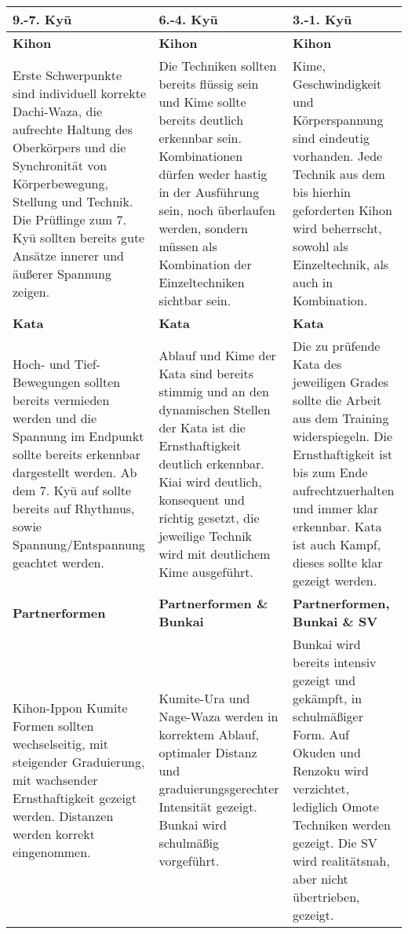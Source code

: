	\null\vfill\null
	\begin{tabularx}{\linewidth}{XXX}
		9.-7. Ky\={u}	& 6.-4. Ky\={u}	& 3.-1. Ky\={u}\\
		\midrule
		{\footnotesize \textbf{Kihon}}&{\footnotesize \textbf{Kihon}}&{\footnotesize \textbf{Kihon}}\\
		{\footnotesize Erste Schwerpunkte sind individuell korrekte Dachi-Waza, die aufrechte Haltung des Oberkörpers und die Synchronität von Körperbewegung, Stellung und Technik. Die Prüflinge zum 7. Ky\={u} sollten bereits gute Ansätze innerer und äußerer Spannung zeigen.}&{\footnotesize Die Techniken sollten bereits flüssig sein und Kime sollte bereits deutlich erkennbar sein. Kombinationen dürfen weder hastig in der Ausführung sein, noch überlaufen werden, sondern müssen als Kombination der Einzeltechniken sichtbar sein.}&{\footnotesize Kime, Geschwindigkeit und Körperspannung sind eindeutig vorhanden. Jede Technik aus dem bis hierhin geforderten Kihon wird beherrscht, sowohl als Einzeltechnik, als auch in Kombination.}\\
		{\footnotesize \textbf{Kata}}&{\footnotesize \textbf{Kata}}&{\footnotesize \textbf{Kata}}\\
		{\footnotesize Hoch- und Tief-Bewegungen sollten bereits vermieden werden und die Spannung im Endpunkt sollte bereits erkennbar dargestellt werden. Ab dem 7. Ky\={u} auf sollte bereits auf Rhythmus, sowie Spannung/Entspannung geachtet werden.}&{\footnotesize Ablauf und Kime der Kata sind bereits stimmig und an den dynamischen Stellen der Kata ist die Ernsthaftigkeit deutlich erkennbar. Kiai wird deutlich, konsequent und richtig gesetzt, die jeweilige Technik wird mit deutlichem Kime ausgeführt.}&{\footnotesize Die zu prüfende Kata des jeweiligen Grades sollte die Arbeit aus dem Training widerspiegeln. Die Ernsthaftigkeit ist bis zum Ende aufrechtzuerhalten und immer klar erkennbar. Kata ist auch Kampf, dieses sollte klar gezeigt werden.}\\
		{\footnotesize \textbf{Partnerformen}}&{\footnotesize \textbf{Partnerformen \& Bunkai}}&{\footnotesize \textbf{Partnerformen, Bunkai \& SV}}\\
		{\footnotesize Kihon-Ippon Kumite Formen sollten wechselseitig, mit steigender Graduierung, mit wachsender Ernsthaftigkeit gezeigt werden. Distanzen werden korrekt eingenommen.}&{\footnotesize Kumite-Ura und Nage-Waza werden in korrektem Ablauf, optimaler Distanz und graduierungsgerechter Intensität gezeigt. Bunkai wird schulmäßig vorgeführt.}&{\footnotesize Bunkai wird bereits intensiv gezeigt und gekämpft, in schulmäßiger Form. Auf Okuden und Renzoku wird verzichtet, lediglich Omote Techniken werden gezeigt. Die SV wird realitätsnah, aber nicht übertrieben, gezeigt.}\\
	\end{tabularx}\null\vfill\null
	\setlength{\tabcolsep}{6pt}